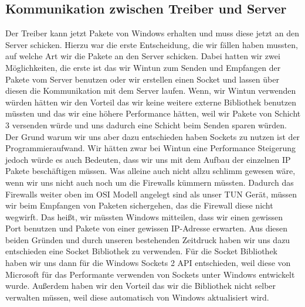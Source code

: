 \subsection{Kommunikation zwischen Treiber und Server}
Der Treiber kann jetzt Pakete von Windows erhalten und muss diese jetzt an den Server schicken. Hierzu war die erste Entscheidung, die wir fällen haben mussten, auf welche Art wir die Pakete an den Server schicken. Dabei hatten wir zwei Möglichkeiten, die erste ist das wir Wintun zum Senden und Empfangen der Pakete vom Server benutzen oder wir erstellen einen Socket und lassen über diesen die Kommunikation mit dem Server laufen.
\newline
\newline
Wenn, wir Wintun verwenden würden hätten wir den Vorteil das wir keine weitere externe Bibliothek benutzen müssten und das wir eine höhere Performance hätten, weil wir Pakete von Schicht 3 versenden würde und uns dadurch eine Schicht beim Senden sparen würden.
\newline
\newline
Der Grund warum wir uns aber dazu entschieden haben Sockets zu nutzen ist der Programmieraufwand. Wir hätten zwar bei Wintun eine Performance Steigerung jedoch würde es auch Bedeuten, dass wir uns mit dem Aufbau der einzelnen IP Pakete beschäftigen müssen. Was alleine auch nicht allzu schlimm gewesen wäre, wenn wir uns nicht auch noch um die Firewalls kümmern müssten. Dadurch das Firewalls weiter oben im OSI Modell angelegt sind als unser TUN Gerät, müssen wir beim Empfangen von Paketen sichergehen, das die Firewall diese nicht wegwirft. Das heißt, wir müssten Windows mitteilen, dass wir einen gewissen Port benutzen und Pakete von einer gewissen IP-Adresse erwarten. Aus diesen beiden Gründen und durch unseren bestehenden Zeitdruck haben wir uns dazu entschieden eine Socket Bibliothek zu verwenden.
\newline
\newline
Für die Socket Bibliothek haben wir uns dann für die Windows Sockets 2 API entschieden, weil diese von Microsoft für das Performante verwenden von Sockets unter Windows entwickelt wurde. Außerdem haben wir den Vorteil das wir die Bibliothek nicht selber verwalten müssen, weil diese automatisch von Windows aktualisiert wird.
